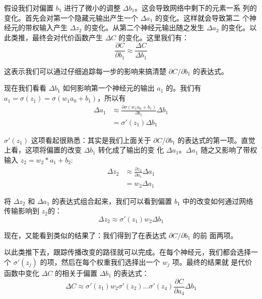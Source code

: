 假设我们对偏置 $b_1$ 进行了微小的调整 $\Delta b_1$。这会导致网络中剩下的元素一系
列的变化。首先会对第一个隐藏元输出产生一个 $\Delta a_1$ 的变化。这样就会导致第二
个神经元的带权输入产生 $\Delta z_2$ 的变化。从第二个神经元输出随之发生 $\Delta
a_2$ 的变化。以此类推，最终会对代价函数产生 $\Delta C$ 的变化。这里我们有：
\begin{equation}
  \frac{\partial C}{\partial b_1} \approx \frac{\Delta C}{\Delta b_1}
  \label{eq:114}\tag{114}
\end{equation}

这表示我们可以通过仔细追踪每一步的影响来搞清楚 $\partial C/\partial b_1$ 的表达式。 

现在我们看看 $\Delta b_1$ 如何影响第一个神经元的输出 $a_1$ 的。我们有 $a_1 =
\sigma(z_1) = \sigma(w_1 a_0 + b_1)$，所以有
\begin{align}
  \Delta a_1 & \approx 
  \frac{\partial \sigma(w_1 a_0+b_1)}{\partial b_1} \Delta b_1 \label{eq:115}\tag{115}\\
  & = \sigma'(z_1) \Delta b_1 \label{eq:116}\tag{116}
\end{align}
 
$\sigma'(z_1)$ 这项看起很熟悉：其实是我们上面关于 $\partial C/\partial b_1$
的表达式的第一项。直觉上看，这项将偏置的改变 $\Delta b_1$ 转化成了输出的变
化 $\Delta a_1$。$\Delta a_1$ 随之又影响了带权输入 $z_2 = w_2 * a_1 +
b_2$:
\begin{align}
  \Delta z_2 & \approx
  \frac{\partial z_2}{\partial a_1} \Delta a_1 \label{eq:117}\tag{117}\\
  & = w_2 \Delta a_1 \label{eq:118}\tag{118}
\end{align}

将 $\Delta z_2$ 和 $\Delta a_1$ 的表达式组合起来，我们可以看到偏置 $b_1$
中的改变如何通过网络传输影响到 $z_2$的：
\begin{equation}
  \Delta z_2 \approx \sigma'(z_1) w_2 \Delta b_1
  \label{eq:119}\tag{119}
\end{equation}
 
现在，又能看到类似的结果了：我们得到了在表达式 $\partial C/\partial b_1$ 的前
面两项。

以此类推下去，跟踪传播改变的路径就可以完成。在每个神经元，我们都会选择一
个 $\sigma'(z_j)$ 的项，然后在每个权重我们选择出一个 $w_j$ 项。最终的结果就
是代价函数中变化 $\Delta C$ 的相关于偏置 $\Delta b_1$ 的表达式：
\begin{equation}
  \Delta C \approx \sigma'(z_1) w_2 \sigma'(z_2) \ldots \sigma'(z_4)
  \frac{\partial C}{\partial a_4} \Delta b_1
\label{eq:120}\tag{120}
\end{equation}


